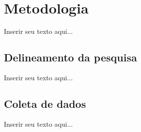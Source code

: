 %
%

\chapter{Metodologia}

Inserir seu texto aqui...

\section{Delineamento da pesquisa}

Inserir seu texto aqui...

\section{Coleta de dados}

Inserir seu texto aqui...


